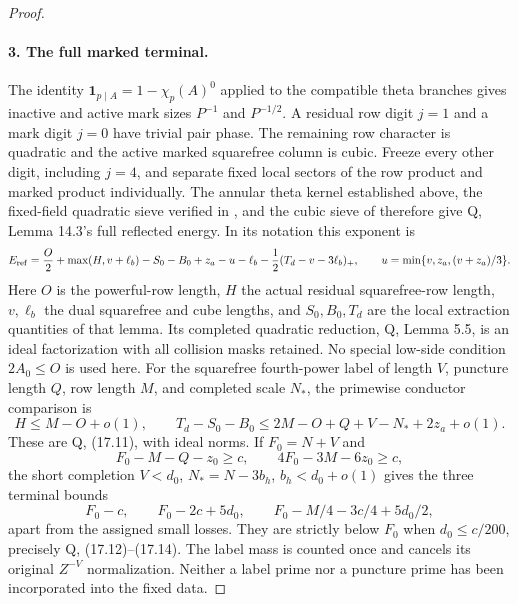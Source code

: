 \documentclass[11pt,a4paper]{article}
\theoremstyle{remark}\newtheorem{remark}[theorem]{Remark}
\newcommand{\one}{\mathbf 1}
\numberwithin{equation}{section}
\begin{document}
\begin{proof}
\paragraph{3. The full marked terminal.}
The identity
$\one_{p\mid A}=1-\chi_p(A)^0$ applied to the compatible
theta branches gives inactive and active mark sizes $P^{-1}$
and $P^{-1/2}$. A residual row digit $j=1$ and a mark digit
$j=0$ have trivial pair phase. The remaining row character is
quadratic and the active marked squarefree column is cubic.
Freeze every other digit, including $j=4$, and separate fixed
local sectors of the row product and marked product individually.
The annular theta kernel established above, the fixed-field quadratic sieve verified in
\cite[Lemma 6.4]{P}, and the cubic sieve of \cite[Theorem 1.3]{BGL}
therefore give Q, Lemma 14.3's full reflected energy. In its
notation this exponent is
\[
 E_{\rm ref}=\frac O2+\max(H,v+\ell_b)-S_0-B_0+z_a-u-\ell_b
       -\frac12(T_d-v-3\ell_b)_+,
 \qquad u=\min\{v,z_a,(v+z_a)/3\}.
\]
Here $O$ is the powerful-row length, $H$ the actual residual
squarefree-row length, $v,\ell_b$ the dual squarefree and cube
lengths, and $S_0,B_0,T_d$ are the local extraction quantities of
that lemma. Its completed quadratic reduction, Q, Lemma 5.5,
is an ideal factorization with all collision masks retained.
No special low-side condition $2A_0\le O$ is used here.
For the squarefree fourth-power label of length $V$, puncture
length $Q$, row length $M$, and completed scale $N_*$, the
primewise conductor comparison is
\[
 H\le M-O+o(1),\qquad
 T_d-S_0-B_0\le2M-O+Q+V-N_*+2z_a+o(1).
\]
These are Q, (17.11), with ideal norms. If $F_0=N+V$ and
\[
 F_0-M-Q-z_0\ge c,\qquad 4F_0-3M-6z_0\ge c,
\]
the short completion $V<d_0$, $N_*=N-3b_h$,
$b_h<d_0+o(1)$ gives the three terminal bounds
\[
 F_0-c,\qquad F_0-2c+5d_0,\qquad
 F_0-M/4-3c/4+5d_0/2,
\]
apart from the assigned small losses. They are strictly below
$F_0$ when $d_0\le c/200$, precisely Q, (17.12)--(17.14).
The label mass is counted once and cancels its original
$Z^{-V}$ normalization. Neither a label prime nor a puncture
prime has been incorporated into the fixed data.


\end{proof}
\end{document}
